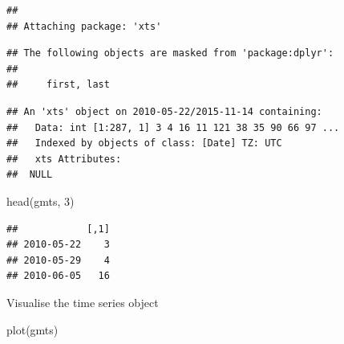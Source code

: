 \documentclass[
]{book}
\newenvironment{Shaded}{\begin{snugshade}}{\end{snugshade}}
\newcommand{\AttributeTok}[1]{\textcolor[rgb]{0.77,0.63,0.00}{#1}}
\newcommand{\CommentTok}[1]{\textcolor[rgb]{0.56,0.35,0.01}{\textit{#1}}}
\newcommand{\DecValTok}[1]{\textcolor[rgb]{0.00,0.00,0.81}{#1}}
\newcommand{\FunctionTok}[1]{\textcolor[rgb]{0.00,0.00,0.00}{#1}}
\newcommand{\NormalTok}[1]{#1}
\newcommand{\OtherTok}[1]{\textcolor[rgb]{0.56,0.35,0.01}{#1}}
\newcommand{\SpecialCharTok}[1]{\textcolor[rgb]{0.00,0.00,0.00}{#1}}
\newcommand{\StringTok}[1]{\textcolor[rgb]{0.31,0.60,0.02}{#1}}
\begin{document}
\begin{verbatim}
## 
## Attaching package: 'xts'
\end{verbatim}

\begin{verbatim}
## The following objects are masked from 'package:dplyr':
## 
##     first, last
\end{verbatim}

\begin{Shaded}
\end{Shaded}

\begin{verbatim}
## An 'xts' object on 2010-05-22/2015-11-14 containing:
##   Data: int [1:287, 1] 3 4 16 11 121 38 35 90 66 97 ...
##   Indexed by objects of class: [Date] TZ: UTC
##   xts Attributes:  
##  NULL
\end{verbatim}

\begin{Shaded}
\begin{Highlighting}[]
\FunctionTok{head}\NormalTok{(gmts, }\DecValTok{3}\NormalTok{)}
\end{Highlighting}
\end{Shaded}

\begin{verbatim}
##            [,1]
## 2010-05-22    3
## 2010-05-29    4
## 2010-06-05   16
\end{verbatim}

Visualise the time series object

\begin{Shaded}
\begin{Highlighting}[]
\FunctionTok{plot}\NormalTok{(gmts)}
\end{Highlighting}
\end{Shaded}
\end{document}
